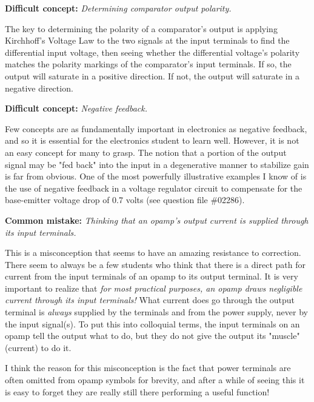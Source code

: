 \vskip 10pt

\noindent
{\bf Difficult concept: } {\it Determining comparator output polarity.}

The key to determining the polarity of a comparator's output is applying Kirchhoff's Voltage Law to the two signals at the input terminals to find the differential input voltage, then seeing whether the differential voltage's polarity matches the polarity markings of the comparator's input terminals.  If so, the output will saturate in a positive direction.  If not, the output will saturate in a negative direction.

\vskip 10pt

\noindent
{\bf Difficult concept: } {\it Negative feedback.}

Few concepts are as fundamentally important in electronics as negative feedback, and so it is essential for the electronics student to learn well.  However, it is not an easy concept for many to grasp.  The notion that a portion of the output signal may be "fed back" into the input in a degenerative manner to stabilize gain is far from obvious.  One of the most powerfully illustrative examples I know of is the use of negative feedback in a voltage regulator circuit to compensate for the base-emitter voltage drop of 0.7 volts (see question file \#02286).

\vskip 10pt

\noindent
{\bf Common mistake: } {\it Thinking that an opamp's output current is supplied through its input terminals.}

This is a misconception that seems to have an amazing resistance to correction.  There seem to always be a few students who think that there is a direct path for current from the input terminals of an opamp to its output terminal.  It is very important to realize that {\it for most practical purposes, an opamp draws negligible current through its input terminals!}  What current does go through the output terminal is {\it always} supplied by the  terminals and from the power supply, never by the input signal(s).  To put this into colloquial terms, the input terminals on an opamp tell the output what to do, but they do not give the output its "muscle" (current) to do it.

I think the reason for this misconception is the fact that power terminals are often omitted from opamp symbols for brevity, and after a while of seeing this it is easy to forget they are really still there performing a useful function!


